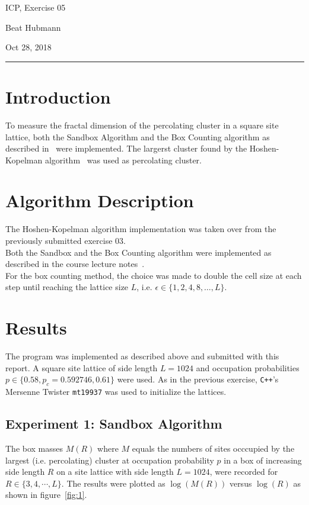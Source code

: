 \documentclass[11pt,a4paper]{article}
\begin{document}
\noindent\parbox{\linewidth}{
 \parbox{.25\linewidth}{ \large ICP, Exercise 05 }\hfill
 \parbox{.5\linewidth}{\begin{center} \large Beat Hubmann \end{center}}\hfill
 \parbox{.2\linewidth}{\begin{flushright} \large Oct 28, 2018 \end{flushright}}
}
\noindent\rule{\linewidth}{2pt}


\section{Introduction}

To measure the fractal dimension of the percolating cluster in a square site lattice, both the Sandbox Algorithm and the Box Counting algorithm as described in~\cite{herrmann} were implemented. The largerst cluster found by the Hoshen-Kopelman algorithm~\cite{hoshen} was used as percolating cluster.

\section{Algorithm Description}
The Hoshen-Kopelman algorithm implementation was taken over from the previously submitted exercise 03.\\
Both the Sandbox and the Box Counting algorithm were implemented as described in the course lecture notes~\cite{herrmann}.\\
For the box counting method, the choice was made to double the cell size at each step until reaching the lattice size $L$, i.e. $\epsilon \in \{1, 2, 4, 8, \ldots, L\}$.

\section{Results}


The program was implemented as described above and submitted with this report. 
A square site lattice of side length $L=1024$ and occupation probabilities $p \in \{0.58, p_c=0.592746, 0.61\}$ were used.
As in the previous exercise, \texttt{C++}'s Mersenne Twister \texttt{mt19937} was used to initialize the lattices.

\subsection{Experiment 1: Sandbox Algorithm}
The box masses $M(R)$ where $M$ equals the numbers of sites occcupied by the largest (i.e. percolating) cluster at occupation probability $p$ in a box of increasing side length $R$ on a site lattice with side length $L=1024$, were recorded for $R \in \{3, 4, \cdots, L\}$. The results were plotted as $\log(M(R))$ versus $\log(R)$ as shown in figure~\ref{fig:1}.
\end{document}
